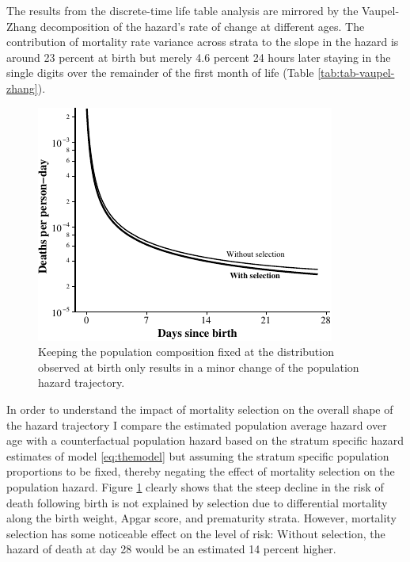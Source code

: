 \documentclass[10pt,twoside,reqno]{article}
\makeatletter
\def\cnstmaxfigwidth{
      \ifdim \Gin@nat@width>\linewidth
        \linewidth
      \else \Gin@nat@width
      \fi
    }
\let\Oldincludegraphics\includegraphics
\renewcommand{\includegraphics}[1]{\Oldincludegraphics[width=\cnstmaxfigwidth]{#1}}
\makeatother
\begin{document}
The results from the discrete-time life table analysis are mirrored by the Vaupel-Zhang decomposition of the hazard's rate of change at different ages. The contribution of mortality rate variance across strata to the slope in the hazard is around 23 percent at birth but merely 4.6 percent 24 hours later staying in the single digits over the remainder of the first month of life (Table \ref{tab:tab-vaupel-zhang}).

\begin{figure}
\centering
\includegraphics{fig/counterfactual_hazards.pdf}
\caption{\label{fig:counterfactual-hazards}Keeping the population composition fixed at the distribution observed at birth only results in a minor change of the population hazard trajectory.}
\end{figure}

In order to understand the impact of mortality selection on the overall shape of the hazard trajectory I compare the estimated population average hazard over age with a counterfactual population hazard based on the stratum specific hazard estimates of model \eqref{eq:themodel} but assuming the stratum specific population proportions to be fixed, thereby negating the effect of mortality selection on the population hazard. Figure \ref{fig:counterfactual-hazards} clearly shows that the steep decline in the risk of death following birth is not explained by selection due to differential mortality along the birth weight, Apgar score, and prematurity strata. However, mortality selection has some noticeable effect on the level of risk: Without selection, the hazard of death at day 28 would be an estimated 14 percent higher.
\end{document}
